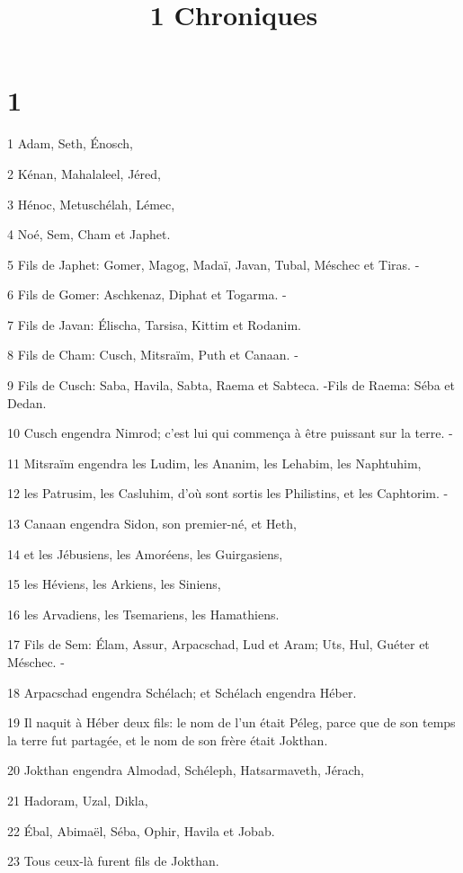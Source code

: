

\title{1 Chroniques}


\chapter{1}

\par 1 Adam, Seth, Énosch,
\par 2 Kénan, Mahalaleel, Jéred,
\par 3 Hénoc, Metuschélah, Lémec,
\par 4 Noé, Sem, Cham et Japhet.
\par 5 Fils de Japhet: Gomer, Magog, Madaï, Javan, Tubal, Méschec et Tiras. -
\par 6 Fils de Gomer: Aschkenaz, Diphat et Togarma. -
\par 7 Fils de Javan: Élischa, Tarsisa, Kittim et Rodanim.
\par 8 Fils de Cham: Cusch, Mitsraïm, Puth et Canaan. -
\par 9 Fils de Cusch: Saba, Havila, Sabta, Raema et Sabteca. -Fils de Raema: Séba et Dedan.
\par 10 Cusch engendra Nimrod; c'est lui qui commença à être puissant sur la terre. -
\par 11 Mitsraïm engendra les Ludim, les Ananim, les Lehabim, les Naphtuhim,
\par 12 les Patrusim, les Casluhim, d'où sont sortis les Philistins, et les Caphtorim. -
\par 13 Canaan engendra Sidon, son premier-né, et Heth,
\par 14 et les Jébusiens, les Amoréens, les Guirgasiens,
\par 15 les Héviens, les Arkiens, les Siniens,
\par 16 les Arvadiens, les Tsemariens, les Hamathiens.
\par 17 Fils de Sem: Élam, Assur, Arpacschad, Lud et Aram; Uts, Hul, Guéter et Méschec. -
\par 18 Arpacschad engendra Schélach; et Schélach engendra Héber.
\par 19 Il naquit à Héber deux fils: le nom de l'un était Péleg, parce que de son temps la terre fut partagée, et le nom de son frère était Jokthan.
\par 20 Jokthan engendra Almodad, Schéleph, Hatsarmaveth, Jérach,
\par 21 Hadoram, Uzal, Dikla,
\par 22 Ébal, Abimaël, Séba, Ophir, Havila et Jobab.
\par 23 Tous ceux-là furent fils de Jokthan.
